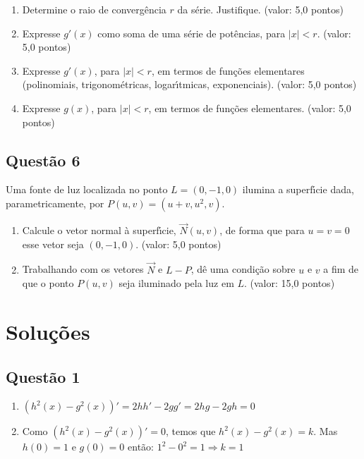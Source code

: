 \begin{enumerate}

\item[(a)] Determine o raio de converg\^encia $r$ da s\'erie. Justifique. (valor: 5,0 pontos) 

\item[(b)] Expresse $g'(x)$ como soma de uma s\'erie de pot\^encias, para $|x|<r$. (valor: 5,0 pontos)

\item[(c)] Expresse $g'(x)$, para $|x|<r$, em termos de fun\c c\~oes elementares (polinomiais, trigonom\'etricas, logar\'\i tmicas, exponenciais). (valor: 5,0 pontos)

\item[(d)] Expresse $g(x)$, para $|x|<r$, em termos de fun\c c\~oes elementares. (valor: 5,0 pontos)

\end{enumerate}

\subsection{\color{blue} Quest\~ao 6}

Uma fonte de luz localizada no ponto $L = (0,-1, 0)$ ilumina a superf\'\i cie dada, parametricamente, por $P(u,v) = (u + v, u^2, v)$.

\begin{enumerate}

\item[(a)] Calcule o vetor normal \`a superf\'\i cie, $\vec N (u,v)$, de forma que para $u = v = 0$ esse vetor seja $(0,-1, 0)$. (valor: 5,0 pontos)

\item[(b)] Trabalhando com os vetores $\vec N$ e $L-P$, d\^e uma condi\c c\~ao sobre $u$ e $v$ a fim de que o ponto $P(u,v)$ seja iluminado pela luz em $L$. (valor: 15,0 pontos)

\end{enumerate}

\section{\color{red} Solu\c c\~oes}

\subsection{\color{red} Quest\~ao 1}

\begin{enumerate}

\item[(a)] $(h^2(x)-g^2(x))'=2hh'-2gg'=2hg-2gh=0$

\item[(b)] Como $(h^2(x)-g^2(x))'=0$, temos que $h^2(x)-g^2(x)=k$. Mas $h(0)=1$ e $g(0)=0$ ent\~ao: $1^2-0^2=1\Longrightarrow k=1$

\end{enumerate}

